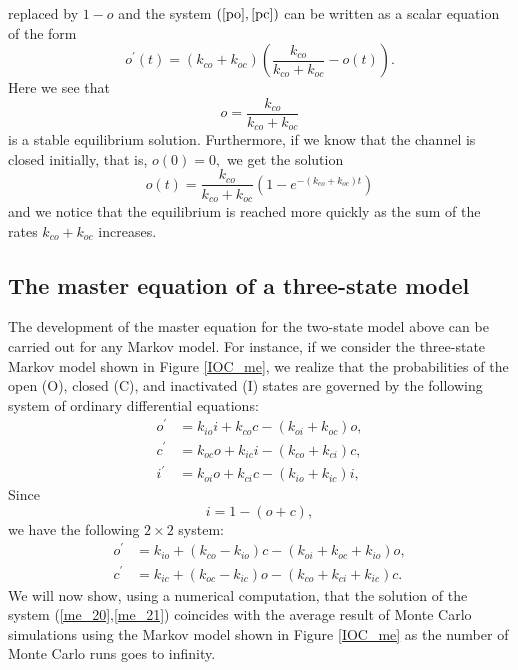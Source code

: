 replaced by $1-o$ and the system $\left(  \ref{po},\ref{pc}\right)  $ can be
written as a scalar equation of the form%
\begin{equation}
o^{\prime}(t)=\left(  k_{co}+k_{oc}\right)  \left(  \frac{k_{co}}%
{k_{co}+k_{oc}}-o\left(  t\right)  \right)  .\label{po2}%
\end{equation}
Here we see that
\[
o=\frac{k_{co}}{k_{co}+k_{oc}}%
\]
is a stable equilibrium solution. Furthermore, if we know that the channel is
closed initially, that is, $o(0)=0,$ we get the solution%
\[
o(t)=\frac{k_{co}}{k_{co}+k_{oc}}\left(  1-e^{-\left(  k_{co}+k_{oc}\right)
t}\right)
\]
and we notice that the equilibrium is reached more quickly as the sum of the rates
$k_{co}+k_{oc}$ increases.

\subsection[Three state model]{The master equation of a three-state model}

The development of the master equation for the two-state model above can be
carried out for any Markov model. For instance, if we consider the three-state
Markov model shown in Figure \ref{IOC_me}, we realize that the probabilities of the
open (O), closed (C), and inactivated (I) states are governed by the following system of ordinary
differential equations:
\begin{align}
o^{\prime}  & =k_{io}i+k_{co}c-\left(  k_{oi}+k_{oc}\right)  o, \nonumber \\
c^{\prime}  & =k_{oc}o+k_{ic}i-\left(  k_{co}+k_{ci}\right)  c,\label{me_11}\\
i^{\prime}  & =k_{oi}o+k_{ci}c-\left(  k_{io}+k_{ic}\right)  i, \nonumber
\end{align}
Since%
\begin{equation}
i=1-\left(  o+c\right),
\end{equation}
we have the following $2 \times 2$ system:%
\begin{align}
o^{\prime}  & =k_{io}+\left(  k_{co}-k_{io}\right)  c-\left(  k_{oi}%
+k_{oc}+k_{io}\right)  o,\label{me_20}\\
c^{\prime}  & =k_{ic}+\left(  k_{oc}-k_{ic}\right)  o-\left(  k_{co}%
+k_{ci}+k_{ic}\right)  c.\label{me_21}%
\end{align}
We will now show, using a numerical computation, that the solution of the
system (\ref{me_20},\ref{me_21}) coincides with the average result of Monte Carlo simulations using
the Markov model shown in Figure \ref{IOC_me} as the number of Monte Carlo runs goes
to infinity. 



